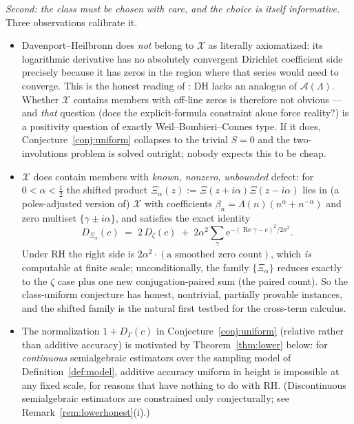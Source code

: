 \documentclass[11pt]{amsart}
\theoremstyle{definition}
\theoremstyle{remark}
\newcommand{\eE}{\mathrm{e}}
\DeclareMathOperator{\Rre}{Re}
\begin{document}
\emph{Second: the class must be chosen with care, and the choice is itself informative.} Three observations calibrate it.
\begin{itemize}
\item[(a)] Davenport--Heilbronn does \emph{not} belong to $\mathcal X$ as literally axiomatized: its logarithmic derivative has no absolutely convergent Dirichlet coefficient side precisely because it has zeros in the region where that series would need to converge. This is the honest reading of \cite[\S6, comment (iii)]{SI}: DH lacks an analogue of $\mathcal A(\Lambda)$. Whether $\mathcal X$ contains members with off-line zeros is therefore not obvious --- and \emph{that} question (does the explicit-formula constraint alone force reality?) is a positivity question of exactly Weil--Bombieri--Connes type. If it does, Conjecture~\ref{conj:uniform} collapses to the trivial $S=0$ and the two-involutions problem is solved outright; nobody expects this to be cheap.
\item[(b)] $\mathcal X$ does contain members with \emph{known, nonzero, unbounded} defect: for $0<\alpha<\tfrac12$ the shifted product $\Xi_\alpha(z):=\Xi(z+i\alpha)\Xi(z-i\alpha)$ lies in (a poles-adjusted version of) $\mathcal X$ with coefficients $\beta_n=\Lambda(n)(n^{\alpha}+n^{-\alpha})$ and zero multiset $\{\gamma\pm i\alpha\}$, and satisfies the exact identity
\[
D_{\Xi_\alpha}(c)\;=\;2\,D_\zeta(c)\;+\;2\alpha^2\!\sum_{\gamma}\eE^{-(\Rre\gamma-c)^2/2\sigma^2}.
\]
Under RH the right side is $2\alpha^2\cdot(\text{a smoothed zero count})$, which \emph{is} computable at finite scale; unconditionally, the family $\{\Xi_\alpha\}$ reduces exactly to the $\zeta$ case plus one new conjugation-paired sum (the paired count). So the class-uniform conjecture has honest, nontrivial, partially provable instances, and the shifted family is the natural first testbed for the cross-term calculus.
\item[(c)] The normalization $1+D_\Gamma(c)$ in Conjecture~\ref{conj:uniform} (relative rather than additive accuracy) is motivated by Theorem~\ref{thm:lower} below: for \emph{continuous} semialgebraic estimators over the sampling model of Definition~\ref{def:model}, additive accuracy uniform in height is impossible at any fixed scale, for reasons that have nothing to do with RH. (Discontinuous semialgebraic estimators are constrained only conjecturally; see Remark~\ref{rem:lowerhonest}(i).)
\end{itemize}

\end{document}
